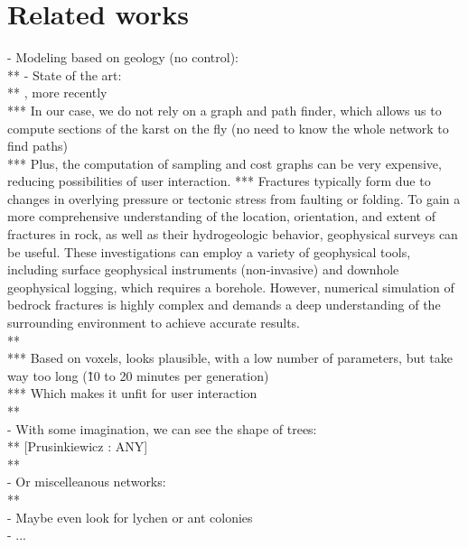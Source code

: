 \section{Related works}
\label{sec:karsts_related-works}
- Modeling based on geology (no control): \\
** \cite{Jaquet2004,Pardo2012}
- State of the art: \\
** \cite{Paris2021}, more recently \cite{Gouy2024} \\
*** In our case, we do not rely on a graph and path finder, which allows us to compute sections of the karst on the fly (no need to know the whole network to find paths) \\
*** Plus, the computation of sampling and cost graphs can be very expensive, reducing possibilities of user interaction. 
*** Fractures typically form due to changes in overlying pressure or tectonic stress from faulting or folding. To gain a more comprehensive understanding of the location, orientation, and extent of fractures in rock, as well as their hydrogeologic behavior, geophysical surveys can be useful. These investigations can employ a variety of geophysical tools, including surface geophysical instruments (non-invasive) and downhole geophysical logging, which requires a borehole. However, numerical simulation of bedrock fractures is highly complex and demands a deep understanding of the surrounding environment to achieve accurate results. \\
** \cite{Pytel2015} \\
*** Based on voxels, looks plausible, with a low number of parameters, but take way too long (\~10 to 20 minutes per generation) \\
*** Which makes it unfit for user interaction \\
** \cite{Collon2015,Collon2017,Jouves2017} \\
- With some imagination, we can see the shape of trees: \\
** [Prusinkiewicz : ANY] \\
** \cite{Runions2008} \\
- Or miscelleanous networks: \\
** \cite{Galin2010, DiasFernandes2018} \\
- Maybe even look for lychen or ant colonies \\
- ...

